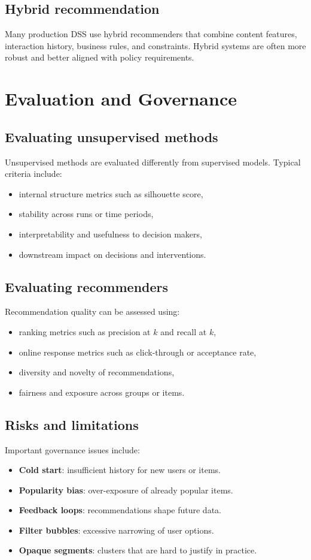 \subsection{Hybrid recommendation}
Many production DSS use hybrid recommenders that combine content features,
interaction history, business rules, and constraints. Hybrid systems are often
more robust and better aligned with policy requirements.

\section{Evaluation and Governance}

\subsection{Evaluating unsupervised methods}
Unsupervised methods are evaluated differently from supervised models. Typical
criteria include:
\begin{itemize}
  \item internal structure metrics such as silhouette score,
  \item stability across runs or time periods,
  \item interpretability and usefulness to decision makers,
  \item downstream impact on decisions and interventions.
\end{itemize}

\subsection{Evaluating recommenders}
Recommendation quality can be assessed using:
\begin{itemize}
  \item ranking metrics such as precision at $k$ and recall at $k$,
  \item online response metrics such as click-through or acceptance rate,
  \item diversity and novelty of recommendations,
  \item fairness and exposure across groups or items.
\end{itemize}

\subsection{Risks and limitations}
Important governance issues include:
\begin{itemize}
  \item \textbf{Cold start}: insufficient history for new users or items.
  \item \textbf{Popularity bias}: over-exposure of already popular items.
  \item \textbf{Feedback loops}: recommendations shape future data.
  \item \textbf{Filter bubbles}: excessive narrowing of user options.
  \item \textbf{Opaque segments}: clusters that are hard to justify in practice.
\end{itemize}

